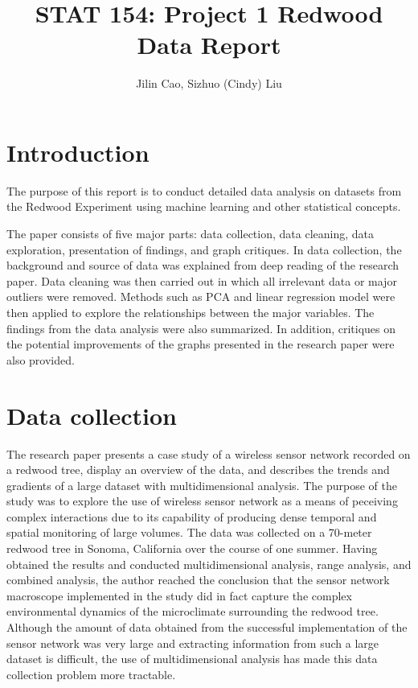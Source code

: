 \documentclass[twocolumn,11pt]{asme2ej}
\title{STAT 154: Project 1 Redwood Data Report}
\author{Jilin Cao, Sizhuo (Cindy) Liu
    \affiliation{
	3033278367, 3032082925
    }	
}
\author{
    \affiliation{
    }
}
\begin{document}
\maketitle    

\section*{Introduction}

The purpose of this report is to conduct detailed data analysis on datasets from the Redwood Experiment using machine learning and other statistical concepts. 

The paper consists of five major parts: data collection, data cleaning, data exploration, presentation of findings, and graph critiques. In data collection, the background and source of data was explained from deep reading of the research paper. Data cleaning was then carried out in which all irrelevant data or major outliers were removed. Methods such as PCA and linear regression model were then applied to explore the relationships between the major variables. The findings from the data analysis were also summarized. In addition, critiques on the potential improvements of the graphs presented in the research paper were also provided.

\section{Data collection}

The research paper presents a case study of a wireless sensor network recorded on a redwood tree, display an overview of the data, and describes the trends and gradients of a large dataset with multidimensional analysis. The purpose of the study was to explore the use of wireless sensor network as a means of peceiving complex interactions due to its capability of producing dense temporal and spatial monitoring of large volumes. The data was collected on a 70-meter redwood tree in Sonoma, California over the course of one summer. Having obtained the results and conducted multidimensional analysis, range analysis, and combined analysis, the author reached the conclusion that the sensor network macroscope implemented in the study did in fact capture the complex environmental dynamics of the microclimate surrounding the redwood tree. Although the amount of data obtained from the successful implementation of the sensor network was very large and extracting information from such a large dataset is difficult, the use of multidimensional analysis has made this data collection problem more tractable. 
\end{document}
